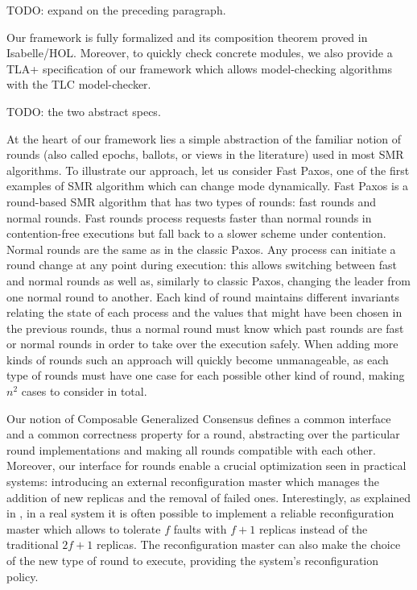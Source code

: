 TODO: expand on the preceding paragraph.

Our framework is fully formalized and its composition theorem proved in Isabelle/HOL. Moreover, to quickly check concrete modules, we also provide a TLA+ specification of our framework which allows model-checking algorithms with the TLC model-checker. 

TODO: the two abstract specs.

At the heart of our framework lies a simple abstraction of the familiar notion of rounds (also called epochs, ballots, or views in the literature) used in most SMR algorithms. To illustrate our approach, let us consider Fast Paxos, one of the first examples of SMR algorithm which can change mode dynamically.
Fast Paxos is a round-based SMR algorithm that has two types of rounds: fast rounds and normal rounds. Fast rounds process requests faster than normal rounds in contention-free executions but fall back to a slower scheme under contention. Normal rounds are the same as in the classic Paxos. Any process can initiate a round change at any point during execution: this allows switching between fast and normal rounds as well as, similarly to classic Paxos, changing the leader from one normal round to
another. Each kind of round maintains different invariants relating the state of each process and the values that might have been chosen in the previous rounds, thus a normal round must know which past rounds are fast or normal rounds in order to take over the execution safely. When adding more kinds of rounds such an approach will quickly become unmanageable, as each type of rounds must have one case for each possible other kind of round, making $n^2$ cases to consider in total.

Our notion of Composable Generalized Consensus defines a common interface and a common correctness property for a round, abstracting over the particular round implementations and making all rounds compatible with each other. 
Moreover, our interface for rounds enable a crucial optimization seen in practical systems: introducing an external reconfiguration master which manages the addition of new replicas and the removal of failed ones. Interestingly, as explained in \cite{LamportMalkhiZhou09VerticalPaxosPrimarybackupReplication}, in a real system it is often possible to implement a reliable reconfiguration master which allows to tolerate $f$ faults with $f+1$ replicas instead of the traditional $2f+1$ replicas.
The reconfiguration master can also make the choice of the new type of round to execute, providing the system's reconfiguration policy. 
